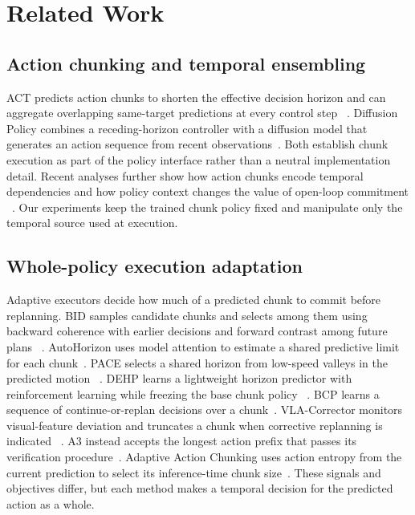 \section{Related Work}
\label{sec:related-work}

\subsection{Action chunking and temporal ensembling}

ACT predicts action chunks to shorten the effective decision horizon and can
aggregate overlapping same-target predictions at every control step
~\cite{zhao2023act}. Diffusion Policy combines a receding-horizon controller
with a diffusion model that generates an action sequence from recent
observations~\cite{chi2023diffusionpolicy}. Both establish chunk execution as
part of the policy interface rather than a neutral implementation detail.
Recent analyses further show how action chunks encode temporal dependencies and
how policy context changes the value of open-loop commitment
~\cite{lazzati2026actionchunking,zeng2026openloop}. Our experiments keep the
trained chunk policy fixed and manipulate only the temporal source used at
execution.

\subsection{Whole-policy execution adaptation}

Adaptive executors decide how much of a predicted chunk to commit before
replanning. BID samples candidate chunks and selects among them using backward
coherence with earlier decisions and forward contrast among future plans
~\cite{liu2025bid}. AutoHorizon uses model attention to estimate a shared
predictive limit for each chunk~\cite{wang2026autohorizon}. PACE selects a
shared horizon from low-speed valleys in the predicted motion
~\cite{nie2026pace}. DEHP learns a lightweight horizon predictor with
reinforcement learning while freezing the base chunk policy
~\cite{zhao2026dehp}. BCP learns a sequence of continue-or-replan decisions
over a chunk~\cite{xu2026bcp}. VLA-Corrector monitors visual-feature deviation
and truncates a chunk when corrective replanning is indicated
~\cite{pan2026vlacorrector}. A3 instead accepts the longest action prefix that
passes its verification procedure~\cite{chen2026a3}. Adaptive Action Chunking
uses action entropy from the current prediction to select its inference-time
chunk size~\cite{liang2026aac}. These signals and objectives differ, but each
method makes a temporal decision for the predicted action as a whole.

